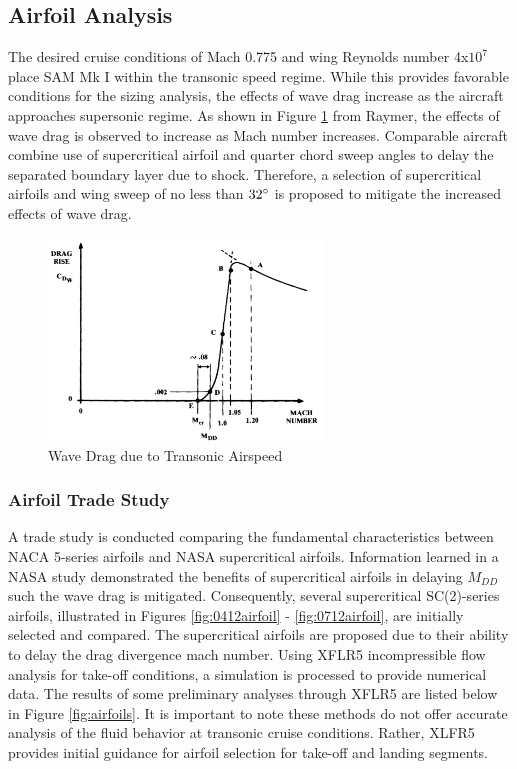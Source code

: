 \subsection{Airfoil Analysis}
The desired cruise conditions of Mach 0.775 and wing Reynolds number 4x$10^7$ place SAM Mk I within the transonic speed regime.  While this provides favorable conditions for the sizing analysis, the effects of wave drag increase as the aircraft approaches supersonic regime.  As shown in Figure \ref{fig:transonic} from Raymer\cite{raymer}, the effects of wave drag is observed to increase as Mach number increases.  Comparable aircraft combine use of supercritical airfoil and quarter chord sweep angles to delay the separated boundary layer due to shock.  Therefore, a selection of supercritical airfoils and wing sweep of no less than $32\degree$ is proposed to mitigate the increased effects of wave drag. 

\begin{figure}[!h]
    \centering
    \includegraphics[width=0.65\textwidth]{Photos/wavedragduetotransonic.png}
    \caption{Wave Drag due to Transonic Airspeed}
    \label{fig:transonic}
\end{figure}

\subsubsection{Airfoil Trade Study}
A trade study is conducted comparing the fundamental characteristics between NACA 5-series airfoils and NASA supercritical airfoils.  Information learned in a NASA study \cite{supercritical} demonstrated the benefits of supercritical airfoils in delaying $M_{DD}$ such the wave drag is mitigated.  Consequently, several supercritical SC(2)-series airfoils, illustrated in Figures \ref{fig:0412airfoil} - \ref{fig:0712airfoil}, are initially selected and compared.  The supercritical airfoils are proposed due to their ability to delay the drag divergence mach number.  Using XFLR5 \cite{xflr5} incompressible flow analysis for take-off conditions, a simulation is processed to provide numerical data.  The results of some preliminary analyses through XFLR5 are listed below in Figure \ref{fig:airfoils}.  It is important to note these methods do not offer accurate analysis of the fluid behavior at transonic cruise conditions.  Rather, XLFR5 provides initial guidance for airfoil selection for take-off and landing segments.
\newpage


